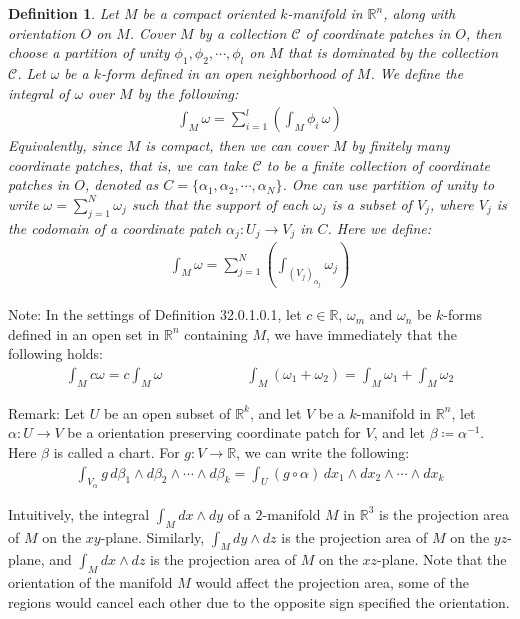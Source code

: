 \documentclass[11pt,oneside]{book}
\theoremstyle{break}
\theoremstyle{break}
\newtheorem{defn}{Definition}[corL]
\newcommand{\R}{\mathbb{R}}
\newcommand{\C}{\mathcal{C}}
\newcommand{\note}{\color{red}Note: \color{black}}
\newcommand{\remark}{\color{blue}Remark: \color{black}}
\begin{document}
\begin{defn}
Let $M$ be a compact oriented $k$-manifold in $\R^n$, along with orientation $O$ on $M$. Cover $M$ by a collection $\C$ of coordinate patches in $O$, then choose a partition of unity $\phi_{1},\phi_2,\cdots, \phi_l$ on $M$ that is dominated by the collection $\C$. Let $\omega$ be a $k$-form defined in an open neighborhood of $M$. We define the integral of $\omega$ over $M$ by the following:
\begin{align*}
\int_M \omega = \sum_{i=1}^l\left( \int_M\phi_i\, \omega\right)
\end{align*}
Equivalently, since $M$ is compact, then we can cover $M$ by finitely many coordinate patches, that is, we can take $\C$ to be a finite collection of coordinate patches in $O$, denoted as $C = \{ \alpha_1, \alpha_2,\cdots, \alpha_N\}$. One can use partition of unity to write $\omega = \sum_{j=1}^N\omega_j $ such that the support of each $\omega_j$ is a subset of $V_j$, where $V_j$ is the codomain of a coordinate patch $\alpha_j: U_j \to V_j$ in $C$. Here we define: 
\begin{align*}
\int_M \omega = \sum_{j=1}^N \left(\int_{(V_j)_{\alpha_j}}\omega_j \right)
\end{align*}
\end{defn}

\note In the settings of Definition 32.0.1.0.1, let $c \in \R$, $\omega_m$ and $\omega_n$ be $k$-forms defined in an open set in $\R^n$ containing $M$, we have immediately that the following holds:
\begin{align*}
\int_M c \omega = c \int_M \omega \qquad\qquad\qquad \int_M(\omega_1+\omega_2) = \int_M \omega_1 + \int_M \omega_2
\end{align*}


\remark Let $U$ be an open subset of $\R^k$, and let $V$ be a $k$-manifold in $\R^n$, let $\alpha:U \to V$ be a orientation preserving coordinate patch for $V$, and let $\beta \coloneqq \alpha^{-1}$. Here $\beta$ is called a chart. For $g :V \to \R$, we can write the following:
\begin{align*}
\int_{V_\alpha} g\, d\beta_1 \wedge d\beta_2 \wedge\cdots \wedge d\beta_k = \int_U (g\circ \alpha)\, dx_1\wedge dx_2 \wedge \cdots \wedge dx_k
\end{align*}

Intuitively, the integral $\int_M dx\wedge dy$ of a $2$-manifold $M$ in $\R^3$ is the projection area of $M$ on the $xy$-plane. Similarly, $\int_M dy\wedge dz$ is the projection area of $M$ on the $yz$-plane, and  $\int_M dx\wedge dz$ is the projection area of $M$ on the $xz$-plane. Note that the orientation of the manifold $M$ would affect the projection area, some of the regions would cancel each other due to the opposite sign specified the orientation.\\
 
\end{document}
